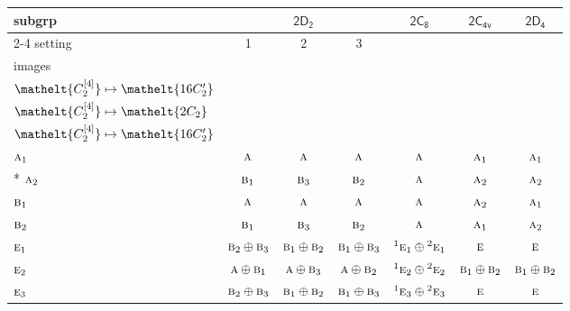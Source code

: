 \documentclass[10pt,a4paper]{article}
\numberwithin{equation}{section}
\newcommand{\eltfont}[1]{{\let\sigma\eltsigma\mathelt{#1}}}
\newcommand{\grp}[1]{\mathsf{#1}}
\newcommand{\irr}[1]{\text{\normalfont\scshape #1}}
\newcommand{\conjpair}[1]{{}^{#1}}
\newcommand{\cls}[1]{\eltfont{#1}}
\newcommand{\genidx}[2]{#1^{[\mathrm{#2}]}}
\begin{document}
{\small\begin{longtable}{@{}lcccccc@{}}\toprule
subgrp & \multicolumn{3}{c}{\href{2D2.pdf}{$\grp{2D_{2}}$}} & \href{2C8.pdf}{$\grp{2C_{8}}$} & \href{2C4v.pdf}{$\grp{2C_{4v}}$} & \href{2D4.pdf}{$\grp{2D_{4}}$}\\\cmidrule(lr){2-4}
setting & 1 & 2 & 3 &  &  & \\
images & {\scriptsize\begin{tabular}[t]{@{}c@{}}$\cls{\genidx{C_{2}}{2}} \mapsto \cls{2C_{2}}$\\$\cls{\genidx{C_{2}}{4}} \mapsto \cls{16C_{2}'}$\end{tabular}} & {\scriptsize\begin{tabular}[t]{@{}c@{}}$\cls{\genidx{C_{2}}{2}} \mapsto \cls{16C_{2}'}$\\$\cls{\genidx{C_{2}}{4}} \mapsto \cls{2C_{2}}$\end{tabular}} & {\scriptsize\begin{tabular}[t]{@{}c@{}}$\cls{\genidx{C_{2}}{2}} \mapsto \cls{16C_{2}'}$\\$\cls{\genidx{C_{2}}{4}} \mapsto \cls{16C_{2}'}$\end{tabular}} &  &  & \\\midrule\endhead
\bottomrule\endfoot\endlastfoot
$\irr{a}_{1}$ & $\irr{a}$ & $\irr{a}$ & $\irr{a}$ & $\irr{a}$ & $\irr{a}_{1}$ & $\irr{a}_{1}$\\*
$\irr{a}_{2}$ & $\irr{b}_{1}$ & $\irr{b}_{3}$ & $\irr{b}_{2}$ & $\irr{a}$ & $\irr{a}_{2}$ & $\irr{a}_{2}$\\
$\irr{b}_{1}$ & $\irr{a}$ & $\irr{a}$ & $\irr{a}$ & $\irr{a}$ & $\irr{a}_{2}$ & $\irr{a}_{1}$\\
$\irr{b}_{2}$ & $\irr{b}_{1}$ & $\irr{b}_{3}$ & $\irr{b}_{2}$ & $\irr{a}$ & $\irr{a}_{1}$ & $\irr{a}_{2}$\\
$\irr{e}_{1}$ & $\irr{b}_{2}\oplus \irr{b}_{3}$ & $\irr{b}_{1}\oplus \irr{b}_{2}$ & $\irr{b}_{1}\oplus \irr{b}_{3}$ & $\conjpair{1}\irr{e}_{1}\oplus \conjpair{2}\irr{e}_{1}$ & $\irr{e}$ & $\irr{e}$\\
$\irr{e}_{2}$ & $\irr{a}\oplus \irr{b}_{1}$ & $\irr{a}\oplus \irr{b}_{3}$ & $\irr{a}\oplus \irr{b}_{2}$ & $\conjpair{1}\irr{e}_{2}\oplus \conjpair{2}\irr{e}_{2}$ & $\irr{b}_{1}\oplus \irr{b}_{2}$ & $\irr{b}_{1}\oplus \irr{b}_{2}$\\
$\irr{e}_{3}$ & $\irr{b}_{2}\oplus \irr{b}_{3}$ & $\irr{b}_{1}\oplus \irr{b}_{2}$ & $\irr{b}_{1}\oplus \irr{b}_{3}$ & $\conjpair{1}\irr{e}_{3}\oplus \conjpair{2}\irr{e}_{3}$ & $\irr{e}$ & $\irr{e}$\\

\end{longtable}}
\end{document}
